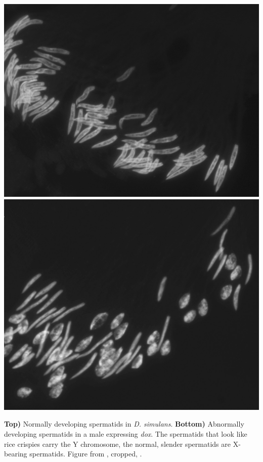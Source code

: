 {\begin{marginfigure}[-3cm]
\begin{center}
\includegraphics[width= \textwidth]{Journal_figs/single_locus_selection/Winters_sex_ratio_drive/Winters_sex_ratio_drive_sperm.jpg}

\end{center}
\caption{{\bf Top)} Normally developing spermatids in {\it D.
  simulans}. {\bf Bottom)}  Abnormally developing spermatids in a male
expressing {\it dox}. The spermatids that look like
  rice crispies carry the Y chromosome,  the normal, slender
  spermatids are X-bearing spermatids.  Figure from
  \citet{tao2007sex}, cropped, \PLOSccBY. } \label{fig:winters_sperm}
\end{marginfigure}

}
